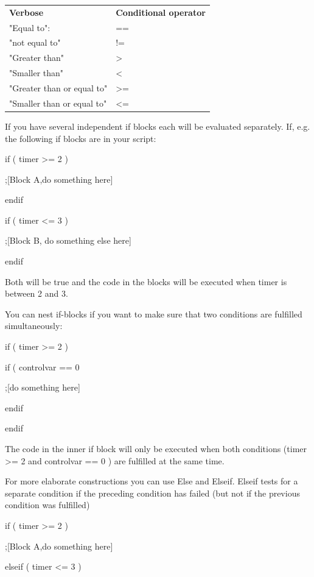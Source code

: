 \documentclass[
]{article}
\begin{document}
\begin{longtable}[]{@{}
  >{\raggedright\arraybackslash}p{}
  >{\raggedright\arraybackslash}p{}@{}}
\toprule
\endhead
\textbf{Verbose} & \textbf{Conditional operator} \\
"Equal to": & == \\
"not equal to" & != \\
"Greater than" & \textgreater{} \\
"Smaller than" & \textless{} \\
"Greater than or equal to" & \textgreater= \\
"Smaller than or equal to" & \textless= \\
\bottomrule
\end{longtable}

If you have several independent if blocks each will be evaluated
separately. If, e.g. the following if blocks are in your script:

if ( timer \textgreater= 2 )

;{[}Block A,do something here{]}

endif

if ( timer \textless= 3 )

;{[}Block B, do something else here{]}

endif

Both will be true and the code in the blocks will be executed when timer
is between 2 and 3.

You can nest if-blocks if you want to make sure that two conditions are
fulfilled simultaneously:

if ( timer \textgreater= 2 )

if ( controlvar == 0

;{[}do something here{]}

endif

endif

The code in the inner if block will only be executed when both
conditions (timer \textgreater= 2 and controlvar == 0 ) are fulfilled at
the same time.

For more elaborate constructions you can use Else and Elseif. Elseif
tests for a separate condition if the preceding condition has failed
(but not if the previous condition was fulfilled)

if ( timer \textgreater= 2 )

;{[}Block A,do something here{]}

elseif ( timer \textless= 3 )
\end{document}
